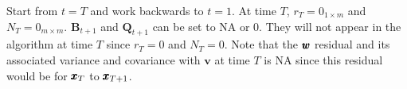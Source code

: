 \documentclass[]{article}
\def\UPS{\mbox{\boldmath $\Upsilon$}}
\def\XI{\mbox{\boldmath $\Xi$}}
\def\BB{\mbox{$\mathbf B$}}	\def\bb{\mbox{$\mathbf b$}} \def\Bb{\mbox{$\mathbf J$}} \def\Ba{\mbox{$\mathbf L$}} \def\Bm{\UPS}
\def\FF{\mbox{$\mathbf F$}} \def\ff{\mbox{$\mathbf f$}}
\def\GG{\mbox{$\mathbf G$}}	\def\gg{\mbox{$\mathbf g$}}
\def\HH{\mbox{$\mathbf H$}}	\def\hh{\mbox{$\mathbf h$}}
\def\KK{\mbox{$\mathbf K$}}
\def\QQ{\mbox{$\mathbf Q$}}	 \def\qq{\mbox{$\mathbf q$}} \def\Qb{\mbox{$\mathbf G$}}  \def\Qm{\mathbb{Q}}
\def\RR{\mbox{$\mathbf R$}}	 \def\rr{\mbox{$\mathbf r$}} \def\Rb{\mbox{$\mathbf H$}}	\def\Rm{\mathbb{R}}
\def\VV{\mbox{$\pmb{V}$}}	\def\vv{\mbox{$\pmb{v}$}}
\def\ZZ{\mbox{$\mathbf Z$}}	\def\zz{\mbox{$\mathbf z$}}	\def\Zb{\mbox{$\mathbf M$}} \def\Za{\mbox{$\mathbf N$}} \def\Zm{\XI}
\def\hatVt{\widehat{\VV}_t}
\begin{document}
Start from $t=T$ and work backwards to $t=1$. At time $T$, $r_T=0_{1 \times m}$ and $N_T=0_{m \times m}$. $\BB_{t+1}$ and $\QQ_{t+1}$ can be set to NA or 0. They will not appear in the algorithm at time $T$ since $r_T=0$ and $N_T=0$. Note that the $\mbox{$\pmb{w}$}$ residual and its associated variance and covariance with $\vv$ at time $T$ is NA since this residual would be for $\mbox{$\pmb{x}$}_T$ to $\mbox{$\pmb{x}$}_{T+1}$.

\end{document}
